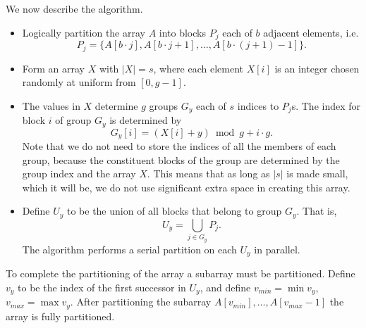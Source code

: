 \documentclass[sigconf]{acmart}
\renewcommand{\paragraph}[1]{\vspace{0.09in}\noindent{\bf \boldmath #1.}}
\theoremstyle{remark}
\theoremstyle{remark}
\begin{document}
\paragraph{Algorithm Description}
We now describe the algorithm.
\begin{itemize}
	\item Logically partition the array $A$ into blocks $P_j$ each of $b$ adjacent elements, i.e. $${P_j = \{A[b\cdot j], A[b\cdot j + 1], \ldots, A[b\cdot (j+1)-1]\}}.$$
	\item Form an array $X$ with $|X|=s$, where each element $X[i]$ is an integer chosen randomly at uniform from $[0, g-1].$
	\item The values in $X$ determine $g$ groups $G_y$ each of $s$ indices to $P_j$s. The index for block $i$ of group $G_y$ is determined by
		$$G_y[i] = (X[i] + y) \bmod g + i\cdot g.$$
		Note that we do not need to store the indices of all the members of each group, because the constituent blocks of the group are determined by the group index and the array $X$. 
		This means that as long as $|s|$ is made small, which it will be, we do not use significant extra space in creating this array.  
	\item Define $U_y$ to be the union of all blocks that belong to group $G_y$. That is,
			$$U_y = \bigcup_{j\in G_y} P_j.$$ 
		The algorithm performs a serial partition on each $U_y$ in parallel.
\end{itemize}
To complete the partitioning of the array a subarray must be partitioned. 
Define $v_y$ to be the index of the first successor in $U_y$, and define $v_{min}=\min{v_y}$,  $v_{max}=\max{v_y}$. 
After partitioning the subarray ${A[v_{min}],\ldots,A[v_{max}-1]}$ the array is fully partitioned.
\end{document}
